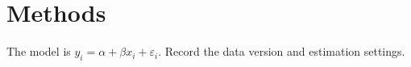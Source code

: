 \section{Methods}\label{sec:methods}
The model is \(y_i=\alpha+\beta x_i+\varepsilon_i\).
Record the data version and estimation settings.
